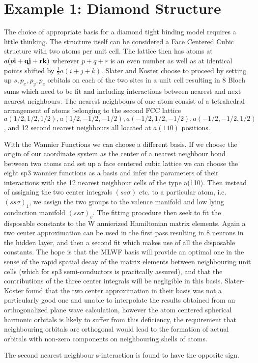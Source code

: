 \section{Example 1: Diamond Structure}
The choice of appropriate basis for a diamond tight binding model requires a little thinking.
The structure itself can be considered a Face Centered Cubic structure with two atoms per unit cell.
The lattice then has atoms at $a(p\bf{i} + q\bf{j} + r\bf{k})$ wherever $p+q+r$ is an even number
as well as at identical points shifted by $\frac{1}{2}a(i+j+k)$. Slater and Koster choose to proceed
by setting up $s,p_{x},p_{y},p_{z}$ orbitals on each of the two sites in a unit cell resulting in 8 
Bloch sums which need to be fit and including interactions between nearest and next nearest neighbours.
The nearest neighbours of one atom consist of a tetrahedral arrangement of atoms belonging to the 
second FCC lattice $a(1/2,1/2,1/2), a(1/2,-1/2,-1/2), a(-1/2,1/2,-1/2), a(-1/2,-1/2,1/2)$,
and 12 second nearest neighbours all located at $a(110)$ positions.

With the Wannier Functions we can choose a different basis. If we choose the origin of our coordinate
system as the center of a nearest neighbour bond between two atoms and set up a face centered cubic lattice
we can choose the eight sp3 wannier functions as a basis and infer the parameters
of their interactions with the 12 nearest neighbour cells of the type a(110). Then instead
of assigning the two center integrals $(ss\sigma)$ etc. to a particular atom, 
i.e. $(ss\sigma)_1$, we assign the two groups to the valence manifold and low lying conduction manifold 
$(ss\sigma)_{v}$. The fitting procedure then seek to fit the disposable constants to the W
annierized Hamiltonian matrix elements. Again a two center approximation can be used in the first pass
resulting in 8 neurons in the hidden layer, and then a second fit which makes use of 
all the disposable constants. The hope is that the MLWF basis will provide an optimal one in the
sense of the rapid spatial decay of the matrix elements between neighbouring unit cells 
(which for sp3 semi-conductors is pracitcally assured), and that the contributions of the three center
integrals will be negligible in this basis. Slater-Koster found that the two center approximation in their
basis was not a particularly good one and unable to interpolate the results obtained
from an orthogonalized plane wave calculation, however the atom centered spherical harmonic orbitals is likely 
to suffer from this deficiency, the requirement that neighbouring orbitals are orthogonal would lead to 
the formation of actual orbitals with non-zero components on neighbouring shells of atoms. 


The second nearest neighbour s-interaction is found to have the opposite sign.

